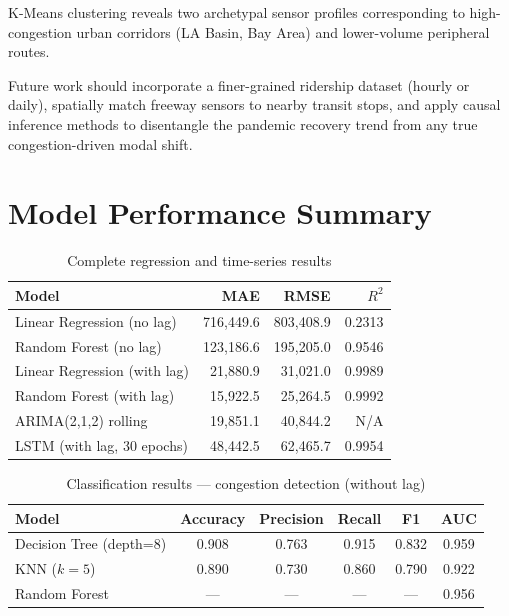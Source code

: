 \documentclass[12pt,a4paper]{article}
\begin{document}
K-Means clustering reveals two archetypal sensor profiles corresponding to high-congestion urban corridors (LA Basin, Bay Area) and lower-volume peripheral routes.

Future work should incorporate a finer-grained ridership dataset (hourly or daily), spatially match freeway sensors to nearby transit stops, and apply causal inference methods to disentangle the pandemic recovery trend from any true congestion-driven modal shift.

\appendix
\section{Model Performance Summary}

\begin{table}[H]
\centering
\caption{Complete regression and time-series results}
\begin{tabular}{lrrr}
\toprule
\textbf{Model} & \textbf{MAE} & \textbf{RMSE} & \textbf{$R^2$} \\
\midrule
Linear Regression (no lag)       & 716,449.6 & 803,408.9 & 0.2313 \\
Random Forest (no lag)           & 123,186.6 & 195,205.0 & 0.9546 \\
Linear Regression (with lag)     & 21,880.9  & 31,021.0  & 0.9989 \\
Random Forest (with lag)         & 15,922.5  & 25,264.5  & 0.9992 \\
ARIMA(2,1,2) rolling             & 19,851.1  & 40,844.2  & N/A    \\
LSTM (with lag, 30 epochs)       & 48,442.5  & 62,465.7  & 0.9954 \\
\bottomrule
\end{tabular}
\end{table}

\begin{table}[H]
\centering
\caption{Classification results — congestion detection (without lag)}
\begin{tabular}{lccccc}
\toprule
\textbf{Model} & \textbf{Accuracy} & \textbf{Precision} & \textbf{Recall} & \textbf{F1} & \textbf{AUC} \\
\midrule
Decision Tree (depth=8) & 0.908 & 0.763 & 0.915 & 0.832 & 0.959 \\
KNN ($k=5$)             & 0.890 & 0.730 & 0.860 & 0.790 & 0.922 \\
Random Forest           & —     & —     & —     & —     & 0.956 \\
\bottomrule
\end{tabular}
\end{table}
\end{document}
